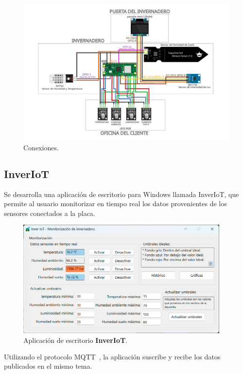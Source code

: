 \begin{figure}[h]
    \centering
    \includegraphics[width=1\textwidth]{img/diagramas/conexiones.png}
    \caption{Conexiones.} \label{Img:conexionesHardware}
\end{figure}
\pagebreak

\subsection{InverIoT}\label{proyecto:InverIoT}
Se desarrolla una aplicación de escritorio para Windows llamada InverIoT, que permite al usuario monitorizar en tiempo real los datos provenientes de los sensores conectados a la placa. 

\begin{figure}[h]
    \centering
    \includegraphics[width=0.95\textwidth]{img/desarrollo/InverIoT_Desktop.png}
	\caption{Aplicación de escritorio \textbf{InverIoT}.}
\end{figure}

Utilizando el protocolo MQTT~\cite{manual:MQTT}, la aplicación suscribe y recibe los datos publicados en el mismo tema. 

